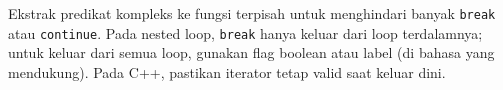 \documentclass[../main.tex]{subfiles}
\begin{document}
Ekstrak predikat kompleks ke fungsi terpisah untuk menghindari banyak \texttt{break} atau \texttt{continue}. Pada nested loop, \texttt{break} hanya keluar dari loop terdalamnya; untuk keluar dari semua loop, gunakan flag boolean atau label (di bahasa yang mendukung). Pada C++, pastikan iterator tetap valid saat keluar dini.
\end{document}

